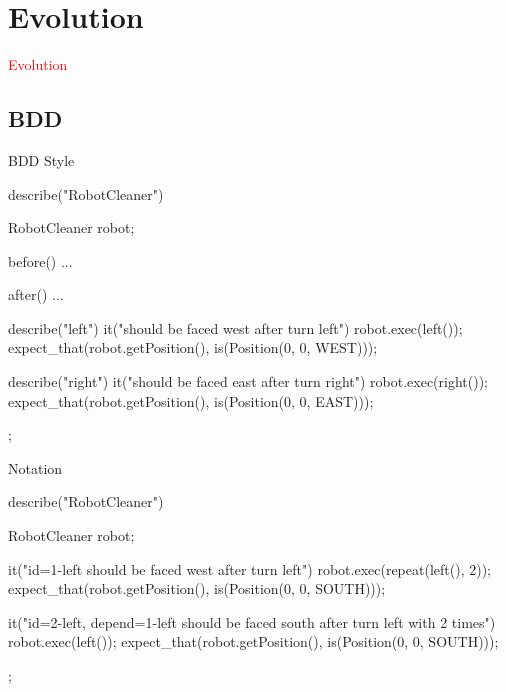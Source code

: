 \section{Evolution}
\label{sec:evolution}

\begin{frame}
  \begin{center}
    \Huge{\textcolor{red}{Evolution}}
  \end{center}
\end{frame}

\subsection{BDD}

\begin{frame}[fragile]{BDD Style}
\begin{c++}
describe("RobotCleaner")
{
    RobotCleaner robot;

    before()
    { ... }

    after()
    { ... }

    describe("left")
    {
        it("should be faced west after turn left")
        {
            robot.exec(left());
            expect_that(robot.getPosition(), is(Position(0, 0, WEST)));
        }
    }

    describe("right")
    {
        it("should be faced east after turn right")
        {
            robot.exec(right());
            expect_that(robot.getPosition(), is(Position(0, 0, EAST)));
        }
    }
};
\end{c++}
\end{frame}

\begin{frame}[fragile]{Notation}
\begin{c++}
describe("RobotCleaner")
{
    RobotCleaner robot;

    it("{id=1-left} should be faced west after turn left")
    {
        robot.exec(repeat(left(), 2));
        expect_that(robot.getPosition(), is(Position(0, 0, SOUTH)));
    }

    it("{id=2-left, depend=1-left} should be faced south after turn left with 2 times")
    {
        robot.exec(left());
        expect_that(robot.getPosition(), is(Position(0, 0, SOUTH)));
    }
};
\end{c++}
\end{frame}
